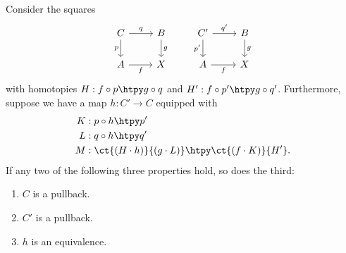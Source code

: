 \begin{lem}\label{lem:pb_3for2}%
Consider the squares
\begin{equation*}
\begin{tikzcd}
C \arrow[r,"q"] \arrow[d,swap,"p"] & B \arrow[d,"g"] & {C'} \arrow[r,"{q'}"] \arrow[d,swap,"{p'}"] & B \arrow[d,"g"] \\
A \arrow[r,swap,"f"] & X & A \arrow[r,swap,"f"] & X
\end{tikzcd}
\end{equation*}
with homotopies $H:f\circ p \htpy g\circ q$ and $H':f\circ p'\htpy g\circ q'$.
Furthermore, suppose we have a map $h:C'\to C$ equipped with
\begin{align*}
K & : p\circ h \htpy p' \\
L & : q\circ h \htpy q' \\
M & : \ct{(H\cdot h)}{(g\cdot L)} \htpy \ct{(f\cdot K)}{H'}.
\end{align*}
If any two of the following three properties hold, so does the third:
\begin{samepage}%
\begin{enumerate}
\item $C$ is a pullback.
\item $C'$ is a pullback.
\item $h$ is an equivalence.
\end{enumerate}%
\end{samepage}%
\end{lem}

